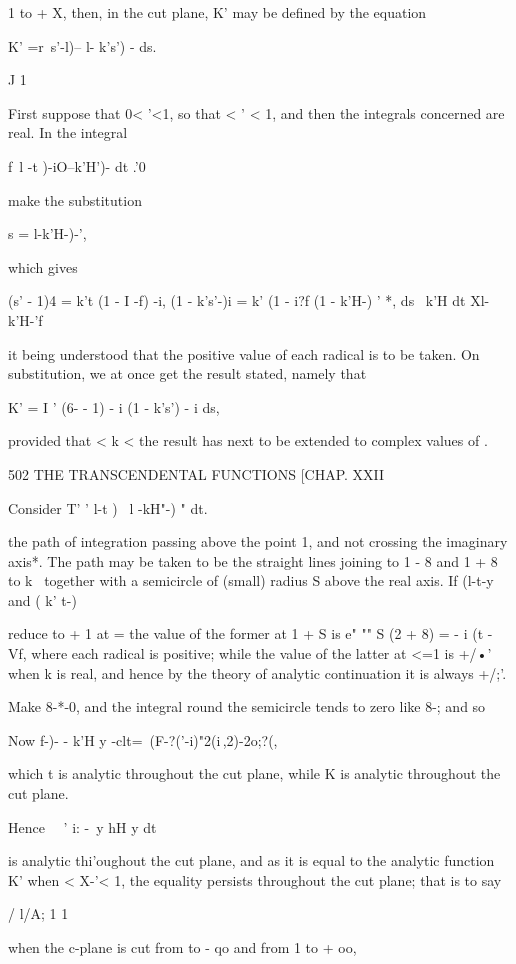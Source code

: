 1 to + X, then, in the cut plane, K' may be defined by the equation

K' =r\ s'-l)-- l- k's') - ds.

J 1

First suppose that 0< '<1, so that < ' < 1, and then the integrals
concerned are real. In the integral

f\ l -t )-iO--k'H')- dt .'0

make the substitution

s = l-k'H-)-',

which gives

(s' - 1)4 = k't (1 - I -f) -i, (1 - k's'-)i = k' (1 - i?f (1 - k'H-) '
*, ds \ k'H dt Xl-k'H-'f

it being understood that the positive value of each radical is to be
taken. On substitution, we at once get the result stated, namely that

K' = I ' (6- - 1) - i (1 - k's') - i ds,

provided that < k <\; the result has next to be extended to complex
values of .

502 THE TRANSCENDENTAL FUNCTIONS [CHAP. XXII

Consider T' ' l-t )~ l -kH"-) " dt.

the path of integration passing above the point 1, and not crossing
the imaginary axis*. The path may be taken to be the straight lines
joining to 1 - 8 and 1 + 8 to k~ together with a semicircle of (small)
radius S above the real axis. If (l-t-y and ( k' t-)

reduce to + 1 at = the value of the former at 1 + S is e" "" S (2 + 8)
= - i (t - Vf, where each radical is positive; while the value of the
latter at <=1 is +/•' when k is real, and hence by the theory of
analytic continuation it is always +/;'.

Make 8-*-0, and the integral round the semicircle tends to zero like
8-; and so

Now f-)- - k'H y -clt=\ (F-?('-i)"2(i\,,2)-2o;?(,

which t is analytic throughout the cut plane, while K is analytic
throughout the cut plane.

Hence \ \ ' i: -\ y hH y dt

is analytic thi'oughout the cut plane, and as it is equal to the
analytic function K' when < X-'< 1, the equality persists throughout
the cut plane; that is to say

/ l/A; 1 1

when the c-plane is cut from to - qo and from 1 to + oo,

